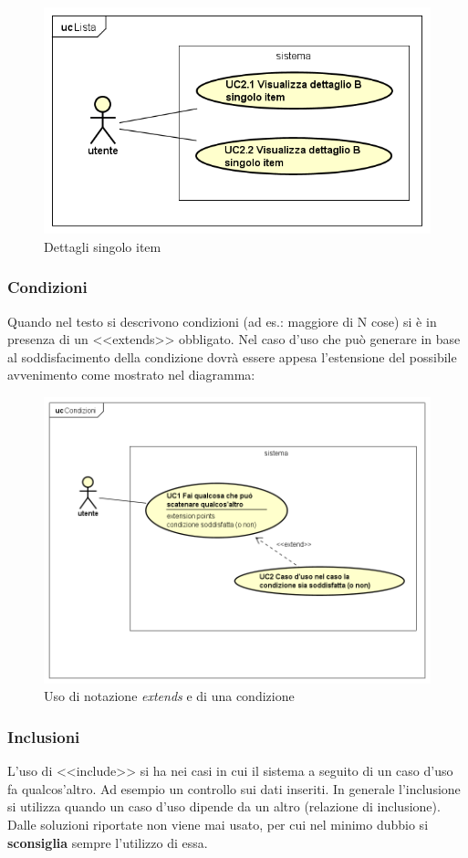 \documentclass[a4paper,11pt]{article}
\begin{document}
		\begin{figure} [h]
			\centering
			\includegraphics[scale=0.50]{UseCasePattern/Lista/ItemDettagli}
			\caption{Dettagli singolo item}
		\end{figure}
		
		
		\newpage
	\subsubsection{Condizioni}
	Quando nel testo si descrivono condizioni (ad es.: maggiore di N cose) si è in presenza di un <<extends>> obbligato. Nel caso d'uso che può generare in base al soddisfacimento della condizione dovrà essere appesa l'estensione del possibile avvenimento come mostrato nel diagramma:
	
		\begin{figure} [h]
			\centering
			\includegraphics[scale=0.5]{UseCasePattern/Condizioni/Condizioni}
			\caption{Uso di notazione \textit{extends} e di una condizione}
		\end{figure}
			
	\subsubsection{Inclusioni} 
	L'uso di <<include>> si ha nei casi in cui il sistema a seguito di un caso d'uso fa qualcos'altro. Ad esempio un controllo sui dati inseriti. In generale l'inclusione si utilizza quando un caso d'uso dipende da un altro (relazione di inclusione). Dalle soluzioni riportate non viene mai usato, per cui nel minimo dubbio si \textbf{sconsiglia} sempre l'utilizzo di essa.
\end{document}
